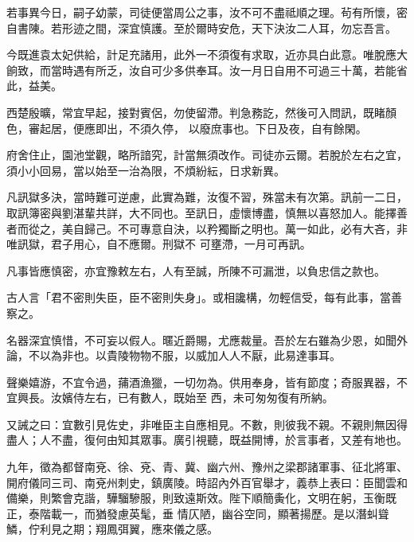 \begin{pinyinscope}
 若事異今日，嗣子幼蒙，司徒便當周公之事，汝不可不盡祗順之理。茍有所懷，密自書陳。若形迹之間，深宜慎護。至於爾時安危，天下決汝二人耳，勿忘吾言。



 今既進袁太妃供給，計足充諸用，此外一不須復有求取，近亦具白此意。唯脫應大餉致，而當時遇有所乏，汝自可少多供奉耳。汝一月日自用不可過三十萬，若能省此，益美。



 西楚殷曠，常宜早起，接對賓侶，勿使留滯。判急務訖，然後可入問訊，既睹顏色，審起居，便應即出，不須久停，
 以廢庶事也。下日及夜，自有餘閑。



 府舍住止，園池堂觀，略所諳究，計當無須改作。司徒亦云爾。若脫於左右之宜，須小小回易，當以始至一治為限，不煩紛紜，日求新異。



 凡訊獄多決，當時難可逆慮，此實為難，汝復不習，殊當未有次第。訊前一二日，取訊簿密與劉湛輩共詳，大不同也。至訊日，虛懷博盡，慎無以喜怒加人。能擇善者而從之，美自歸己。不可專意自決，以矜獨斷之明也。萬一如此，必有大吝，非唯訊獄，君子用心，自不應爾。刑獄不
 可壅滯，一月可再訊。



 凡事皆應慎密，亦宜豫敕左右，人有至誠，所陳不可漏泄，以負忠信之款也。



 古人言「君不密則失臣，臣不密則失身」。或相讒構，勿輕信受，每有此事，當善察之。



 名器深宜慎惜，不可妄以假人。暱近爵賜，尤應裁量。吾於左右雖為少恩，如聞外論，不以為非也。以貴陵物物不服，以威加人人不厭，此易達事耳。



 聲樂嬉游，不宜令過，蒱酒漁獵，一切勿為。供用奉身，皆有節度；奇服異器，不宜興長。汝嬪侍左右，已有數人，既始至
 西，未可匆匆復有所納。



 又誡之曰：宜數引見佐史，非唯臣主自應相見。不數，則彼我不親。不親則無因得盡人；人不盡，復何由知其眾事。廣引視聽，既益開博，於言事者，又差有地也。



 九年，徵為都督南兗、徐、兗、青、冀、幽六州、豫州之梁郡諸軍事、征北將軍、開府儀同三司、南兗州刺史，鎮廣陵。時詔內外百官舉才，義恭上表曰：臣聞雲和備樂，則繁會克諧，驊騮驂服，則致遠斯效。陛下順簡夤化，文明在躬，玉衡既正，泰階載一，而猶發慮英髦，垂
 情仄陋，幽谷空同，顯著揚歷。是以潛虯聳鱗，佇利見之期；翔鳳弭翼，應來儀之感。




\end{pinyinscope}
